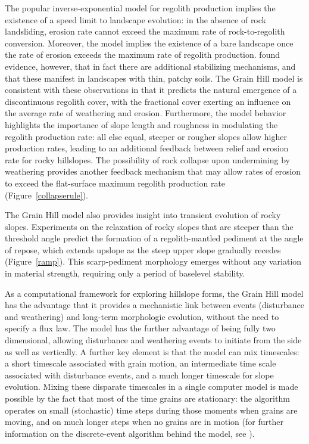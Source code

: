 \documentclass[esurf, manuscript]{copernicus}
\begin{document}
The popular inverse-exponential model for regolith production implies the existence of a speed limit to landscape evolution: in the absence of rock landsliding, erosion rate cannot exceed the maximum rate of rock-to-regolith conversion. Moreover, the model implies the existence of a bare landscape once the rate of erosion exceeds the maximum rate of regolith production. \citet{heimsath2012soil} found evidence, however, that in fact there are additional stabilizing mechanisms, and that these manifest in landscapes with thin, patchy soils. The 
Grain Hill model is consistent with these observations in that it predicts the natural emergence of a discontinuous regolith cover, with the fractional cover exerting an influence on the average rate of weathering and erosion. Furthermore, the model behavior highlights the importance of slope length and roughness in modulating the regolith production rate: all else equal, steeper or rougher slopes allow higher production rates, leading to an additional feedback between relief and erosion rate for rocky hillslopes. The possibility of rock collapse upon undermining by weathering provides another feedback mechanism that may allow rates of erosion to exceed the flat-surface maximum regolith production rate (Figure~\ref{collapserule}).

The Grain Hill model also provides insight into transient evolution of rocky slopes. Experiments on the relaxation of rocky slopes that are steeper than the threshold angle predict the formation of a regolith-mantled pediment at the angle of repose, which extends upslope as the steep upper slope gradually recedes (Figure~\ref{ramp}). This scarp-pediment morphology emerges without any variation in material strength, requiring only a period of baselevel stability.

As a computational framework for exploring hillslope forms, the Grain Hill model has the advantage that it provides a mechanistic link between events (disturbance and weathering) and long-term morphologic evolution, without the need to specify a flux law. The model has the further advantage of being fully two dimensional, allowing disturbance and weathering events to initiate from the side as well as vertically. A further key element is that the model can mix timescales: a short timescale associated with grain motion, an intermediate time scale associated with disturbance events, and a much longer timescale for slope evolution. Mixing these disparate timescales in a single computer model is made possible by the fact that most of the time grains are stationary: the algorithm operates on small (stochastic) time steps during those moments when grains are moving, and on much longer steps when no grains are in motion (for further information on the discrete-event algorithm behind the model, see \citet{tucker2016celllab}).
\end{document}
